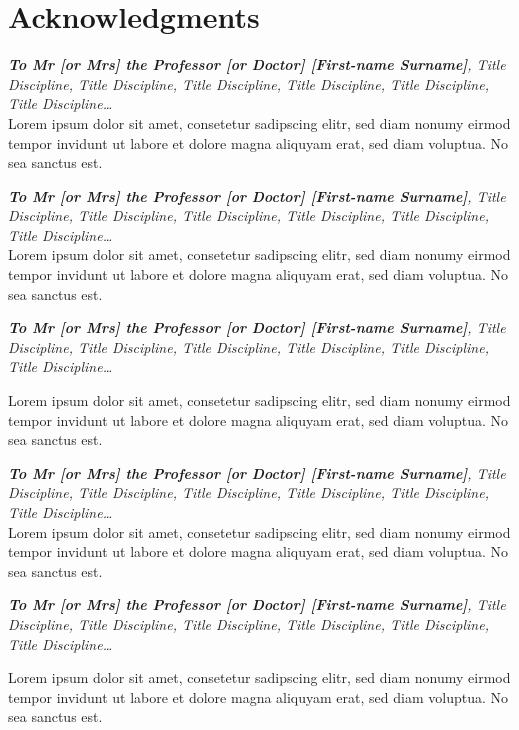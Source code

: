 \chapter*{Acknowledgments}\label{chap:Acknowledgments}


\textit{\textbf{To Mr [or Mrs] the Professor [or Doctor] [First-name Surname]}, Title Discipline, Title Discipline, Title Discipline, Title Discipline, Title Discipline, Title Discipline…}\\

 \setlength{\parindent}{1cm}
Lorem ipsum dolor sit amet, consetetur sadipscing elitr, sed diam nonumy eirmod tempor invidunt ut labore et dolore magna aliquyam erat, sed diam voluptua. No sea sanctus est.\\
 \setlength{\parindent}{0cm}


\textit{\textbf{To Mr [or Mrs] the Professor [or Doctor] [First-name Surname]}, Title Discipline, Title Discipline, Title Discipline, Title Discipline, Title Discipline, Title Discipline…}\\

 \setlength{\parindent}{1cm}
Lorem ipsum dolor sit amet, consetetur sadipscing elitr, sed diam nonumy eirmod tempor invidunt ut labore et dolore magna aliquyam erat, sed diam voluptua. No sea sanctus est.\\
 \setlength{\parindent}{0cm}


\textit{\textbf{To Mr [or Mrs] the Professor [or Doctor] [First-name Surname]}, Title Discipline, Title Discipline, Title Discipline, Title Discipline, Title Discipline, Title Discipline…}\\

 \setlength{\parindent}{1cm}

Lorem ipsum dolor sit amet, consetetur sadipscing elitr, sed diam nonumy eirmod tempor invidunt ut labore et dolore magna aliquyam erat, sed diam voluptua. No sea sanctus est.\\
 \setlength{\parindent}{0cm}


\textit{\textbf{To Mr [or Mrs] the Professor [or Doctor] [First-name Surname]}, Title Discipline, Title Discipline, Title Discipline, Title Discipline, Title Discipline, Title Discipline…}\\

 \setlength{\parindent}{1cm}
Lorem ipsum dolor sit amet, consetetur sadipscing elitr, sed diam nonumy eirmod tempor invidunt ut labore et dolore magna aliquyam erat, sed diam voluptua. No sea sanctus est.\\
 \setlength{\parindent}{0cm}


\textit{\textbf{To Mr [or Mrs] the Professor [or Doctor] [First-name Surname]}, Title Discipline, Title Discipline, Title Discipline, Title Discipline, Title Discipline, Title Discipline…}\\

 \setlength{\parindent}{1cm}

Lorem ipsum dolor sit amet, consetetur sadipscing elitr, sed diam nonumy eirmod tempor invidunt ut labore et dolore magna aliquyam erat, sed diam voluptua. No sea sanctus est.\\
 \setlength{\parindent}{0cm}

